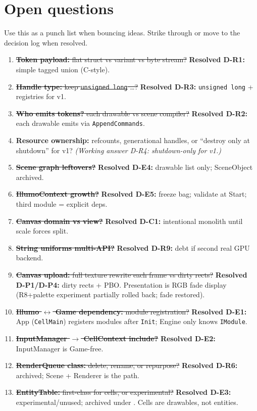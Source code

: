 \section{Open questions}
\label{sec:open}

Use this as a punch list when bouncing ideas. Strike through or move to the
decision log when resolved.

\begin{openbox}
\begin{enumerate}
  \item \sout{\textbf{Token payload:} flat struct vs variant vs byte stream?}
        \textbf{Resolved D-R1:} simple tagged union (C-style).
  \item \sout{\textbf{Handle type:} keep \texttt{unsigned long} \ldots?}
        \textbf{Resolved D-R3:} \texttt{unsigned long} + registries for v1.
  \item \sout{\textbf{Who emits tokens?} each drawable vs scene compiler?}
        \textbf{Resolved D-R2:} each drawable emits via \texttt{AppendCommands}.
  \item \textbf{Resource ownership:} refcounts, generational handles, or
        ``destroy only at shutdown'' for v1?
        \emph{(Working answer D-R4: shutdown-only for v1.)}
  \item \sout{\textbf{Scene graph leftovers?}}
        \textbf{Resolved D-E4:} drawable list only; SceneObject archived.
  \item \sout{\textbf{IllumoContext growth?}}
        \textbf{Resolved D-E5:} freeze bag; validate at Start; third module =
        explicit deps.
  \item \sout{\textbf{Canvas domain vs view?}}
        \textbf{Resolved D-C1:} intentional monolith until scale forces split.
  \item \sout{\textbf{String uniforms multi-API?}}
        \textbf{Resolved D-R9:} debt if second real GPU backend.
  \item \sout{\textbf{Canvas upload:} full texture rewrite each frame vs dirty rects?}
        \textbf{Resolved D-P1/D-P4:} dirty rects + PBO. Presentation is RGB
        fade display (R8+palette experiment partially rolled back; fade restored).
  \item \sout{\textbf{Illumo $\leftrightarrow$ Game dependency:} module registration?}
        \textbf{Resolved D-E1:} App (\texttt{CellMain}) registers modules after
        \texttt{Init}; Engine only knows \texttt{IModule}.
  \item \sout{\textbf{InputManager $\rightarrow$ CellContext include?}}
        \textbf{Resolved D-E2:} InputManager is Game-free.
  \item \sout{\textbf{RenderQueue class:} delete, rename, or repurpose?}
        \textbf{Resolved D-R6:} archived; Scene + Renderer is the path.
  \item \sout{\textbf{EntityTable:} first-class for cells, or experimental?}
        \textbf{Resolved D-E3:} experimental/unused; archived under
        . Cells are drawables, not entities.


\end{enumerate}
\end{openbox}
